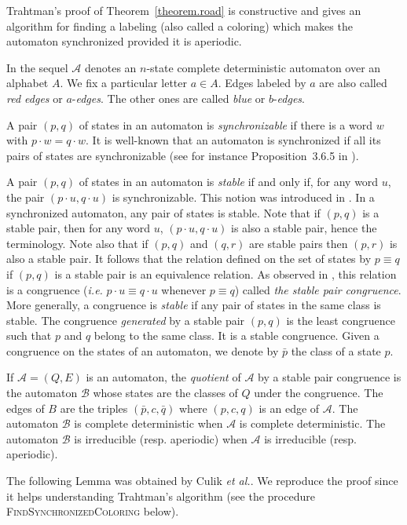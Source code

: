 \documentclass[11pt,a4paper]{article}
\def\A{\mathcal{A}}
\def\B{\mathcal{B}}
\newcommand{\ie}{{\itshape i.e.}\xspace }
\newcommand{\etal}{{\itshape et al.}\xspace }
\newcommand{\resp}{{resp.}\xspace }
\begin{document}
Trahtman's proof of Theorem~\ref{theorem.road} is constructive and
gives an algorithm for finding a labeling (also called a coloring) which
makes the automaton synchronized provided it is aperiodic.

In the sequel $\A$ denotes an $n$-state complete deterministic
automaton over an alphabet $A$. We fix a particular letter $a \in A$.
Edges labeled by $a$ are also called \emph{red edges} or
$a$-\emph{edges}. The other ones are called \emph{blue} or
$b$-\emph{edges}.


A pair $(p,q)$ of states in an automaton is \emph{synchronizable} if
there is a word $w$ with $p \cdot w = q \cdot w$.  It is well-known
that an automaton is synchronized if all its pairs of states are
synchronizable (see for instance Proposition~3.6.5 in
\cite{BerstelPerrinReutenauer2010}). 

A pair $(p,q)$ of states in an automaton is \emph{stable} if and only
if, for any word $u$, the pair $(p \cdot u, q \cdot u)$ is
synchronizable. This notion was introduced in \cite{CulikEtAl1999}.
In a synchronized automaton, any pair of states is stable.  Note that
if $(p,q)$ is a stable pair, then for any word $u$, $(p \cdot u, q
\cdot u)$ is also a stable pair, hence the terminology. Note also that
if $(p,q)$ and $(q,r)$ are stable pairs then $(p,r)$ is also a stable
pair. It follows that the relation defined on the set of states by $p
\equiv q$ if $(p,q)$ is a stable pair is an equivalence relation. As
observed in \cite[Lemma~2]{Kari03}, this relation is a congruence (\ie
$p \cdot u \equiv q \cdot u$ whenever $p \equiv q$) called \emph{the
  stable pair congruence}.  More generally, a congruence is
\emph{stable} if any pair of states in the same class is stable. The
congruence \emph{generated} by a stable pair $(p,q)$ is the least
congruence such that $p$ and $q$ belong to the same class. It is a
stable congruence. Given a congruence on the states of an automaton,
we denote by $\bar{p}$ the class of a state $p$.


If $\A=(Q,E)$ is an automaton, the \emph{quotient} of $\A$ by a stable
pair congruence is the automaton $\B$ whose states are the classes of
$Q$ under the congruence. The edges of $B$ are the triples
$(\bar{p},c,\bar{q})$ where $(p,c,q)$ is an edge of $\A$.  The
automaton $\B$ is complete deterministic when $\A$ is complete
deterministic. The automaton $\B$ is irreducible (\resp aperiodic)
when $\A$ is irreducible (\resp aperiodic).

The following Lemma was obtained by Culik \etal \cite{CulikEtAl02}.
We reproduce the proof since it helps understanding Trahtman's algorithm
(see the procedure \textsc{FindSynchronizedColoring} below).
\end{document}
